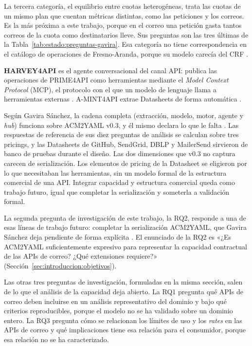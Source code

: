 La tercera categoría, el equilibrio entre cuotas heterogéneas, trata las
cuotas de un mismo plan que cuentan métricas distintas, como las
peticiones y los correos. Es la más próxima a este trabajo, porque en el
correo una petición gasta tantos correos de la cuota como destinatarios
lleve. Sus preguntas son las tres últimas de la
Tabla~\ref{tab:estado:preguntas-gavira}. Esa categoría no tiene
correspondencia en el catálogo de operaciones de Fresno-Aranda, porque su modelo
carecía del CRF \citep{gavira2026tfm}.

\textbf{HARVEY4API} es el agente conversacional del canal API: publica
las operaciones de PRIME4API como herramientas mediante el
\textit{Model Context Protocol} (MCP), el protocolo con el que un modelo
de lenguaje llama a herramientas externas \citep{mcp,ruizlopez2026tfm}.
A-MINT4API extrae Datasheets de forma automática \citep{gavira2026tfm}.

Según Gavira Sánchez, la cadena completa (extracción, modelo, motor,
agente y \textit{hub}) funciona sobre ACM2YAML v0.3, y él mismo declara
lo que le falta \citep{gavira2026tfm}. Las respuestas de referencia de sus
diez preguntas de análisis se calculan sobre tres pricings, y las
Datasheets de GitHub, SendGrid, DBLP y MailerSend sirvieron de banco de
pruebas durante el diseño. Las dos dimensiones que v0.3 no captura
carecen de serialización. Los elementos de pricing de la Datasheet se
eligieron por lo que necesitaban las herramientas, sin un modelo formal
de la estructura comercial de una API. Integrar capacidad y estructura
comercial queda como trabajo futuro, igual que completar la serialización
y someterla a validación formal.

La segunda pregunta de investigación de este trabajo, la RQ2, responde a
una de esas líneas de trabajo futuro: completar la serialización
ACM2YAML, que Gavira Sánchez deja pendiente de forma explícita
\citep{gavira2026tfm}. El enunciado de la RQ2 es «¿Es ACM2YAML suficientemente expresivo para representar la
capacidad contractual de las APIs de correo? ¿Qué extensiones requiere?»
(Sección~\ref{sec:introduccion:objetivos}).

Las otras tres preguntas de investigación, formuladas en la misma
sección, salen de lo que el análisis de la capacidad deja abierto. La
RQ1 pregunta qué APIs de correo deben incluirse en un análisis
representativo del dominio y bajo qué criterios reproducibles, porque el
modelo no se ha validado sobre un dominio entero. La RQ3 pregunta cómo se
relacionan los límites de uso y los \textit{rates} en las APIs de correo
y qué implicaciones tiene esa relación para el consumidor, porque esa
relación no se ha caracterizado.

